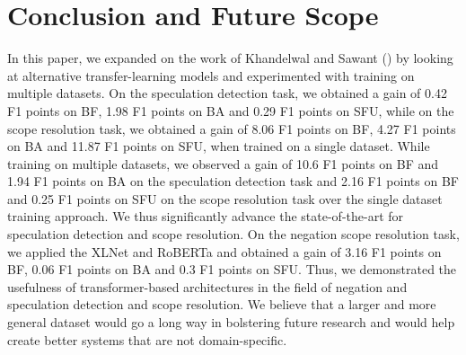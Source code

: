 \documentclass[runningheads]{llncs}
\begin{document}
\section{Conclusion and Future Scope}
\noindent
\par In this paper, we expanded on the work of Khandelwal and Sawant (\cite{2019arXiv191104211K}) by looking at alternative transfer-learning models and experimented with training on multiple datasets. 
On the speculation detection task, we obtained a gain of 0.42 F1 points on BF, 1.98 F1 points on BA and 0.29 F1 points on SFU, while on the scope resolution task, we obtained a gain of  8.06 F1 points on BF,  4.27 F1 points on BA and 11.87 F1 points on SFU, when trained on a single dataset. While training on multiple datasets, we observed a  gain of 10.6 F1 points on BF and 1.94 F1 points on BA on the speculation detection task and 2.16 F1 points on BF and 0.25 F1 points on SFU on the scope resolution task over the single dataset training approach. We thus significantly advance the state-of-the-art for speculation detection and scope resolution.
On the negation scope resolution task, we applied the XLNet and RoBERTa and obtained a gain of 3.16 F1 points on BF, 0.06 F1 points on BA and 0.3 F1 points on SFU. 
Thus, we demonstrated the usefulness of transformer-based architectures in the field of negation and speculation detection and scope resolution.
We believe that a larger and more general dataset  would go a long way in bolstering future research and would help create better systems that are not domain-specific.



\end{document}
